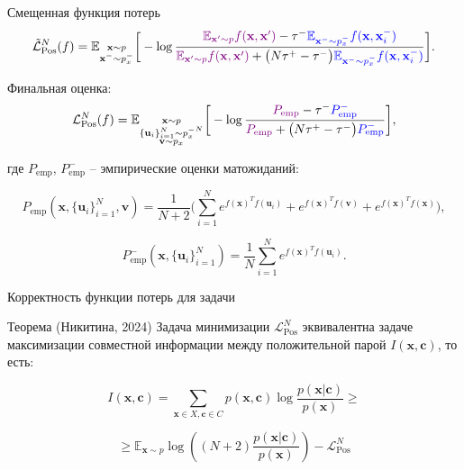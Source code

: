 \documentclass{beamer}
\begin{document}
\begin{frame}{Смещенная функция потерь}
\small
\begin{equation*}
\tilde{\mathcal{L}}_{\text{Pos}}^N (f) = \mathbb{E}_{\substack{\textbf{x} \sim p \\ \textbf{x}^- \sim p_x^-}} \bigg[ - \log \frac{\color{violet} \mathbb{E}_{\textbf{x}' \sim p} f(\textbf{x}, \textbf{x}') \color{black} - \tau^- \color{blue} \mathbb{E}_{\textbf{x}^- \sim p_x^-} f(\textbf{x}, \textbf{x}_i^-)}{\color{violet} \mathbb{E}_{\textbf{x}' \sim p} f(\textbf{x}, \textbf{x}') \color{black} + \big(N \tau^+ - \tau^-\big) \color{blue} \mathbb{E}_{\textbf{x}^- \sim p_x^-} f(\textbf{x}, \textbf{x}_i^-)}\bigg].
\end{equation*}

Финальная оценка:
\begin{equation*}
\mathcal{L}_{\text{Pos}}^N (f) = \mathbb{E}_{\substack{\textbf{x} \sim p \\ \{\textbf{u}_i\}_{i=1}^N \sim {p_x^-}^N \\ \textbf{v} \sim p_x}} \bigg[-\log \frac{\color{violet}P_{\text{emp}} \color{black} - \tau^- \color{blue} P_{\text{emp}}^-} {\color{violet}P_{\text{emp}} \color{black} + \big(N \tau^+ - \tau^-\big) \color{blue} P_{\text{emp}}^- }\bigg],
\end{equation*}

\noindent где $P_{\text{emp}}$, $P_{\text{emp}}^-$ -- эмпирические оценки матожиданий:

\[P_{\text{emp}} (\textbf{x}, \{\textbf{u}_i\}_{i=1}^N, \textbf{v}) = \frac{1}{N+2} \bigg(\sum \limits_{i=1}^N e^{f(\textbf{x})^T f(\textbf{u}_i)} + e^{f(\textbf{x})^T f(\textbf{v})} + e^{f(\textbf{x})^T f(\textbf{x})}\bigg),\]

\[P_{\text{emp}}^- (\textbf{x}, \{\textbf{u}_i\}_{i=1}^N) = \frac{1}{N} \sum \limits_{i=1}^N e^{f(\textbf{x})^T f(\textbf{u}_i)}.\]
\end{frame}
\begin{frame}{Корректность функции потерь для задачи}
\begin{block}{Теорема (Никитина, 2024)}
Задача минимизации $\mathcal{L}_{\text{Pos}}^N$ эквивалентна задаче максимизации совместной информации между положительной парой $I(\mathbf{x}, \mathbf{c})$, то есть:

\[I(\mathbf{x}, \mathbf{c}) = \sum\limits_{\mathbf{x} \in X, \mathbf{c} \in C}p(\mathbf{x}, \mathbf{c})\log \frac{p(\mathbf{x}|\mathbf{c})}{p(\mathbf{x})} \geq\]

\[\geq \mathbb{E}_{\mathbf{x} \sim p}\log\left((N + 2)\frac{p(\mathbf{x}|\mathbf{c})}{p(\mathbf{x})}\right) - \mathcal{L}_{\text{Pos}}^N\]
\end{block}
\end{frame}
\end{document}
